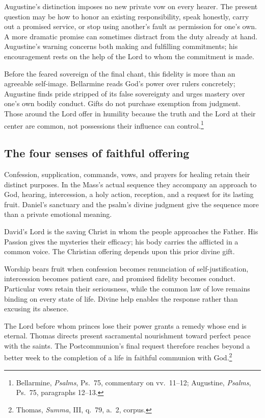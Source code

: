 Augustine's distinction imposes no new private vow on every hearer. The present question may be how to honor an existing responsibility, speak honestly, carry out a promised service, or stop using another's fault as permission for one's own. A more dramatic promise can sometimes distract from the duty already at hand. Augustine's warning concerns both making and fulfilling commitments; his encouragement rests on the help of the Lord to whom the commitment is made.

Before the feared sovereign of the final chant, this fidelity is more than an agreeable self-image. Bellarmine reads God's power over rulers concretely; Augustine finds pride stripped of its false sovereignty and urges mastery over one's own bodily conduct. Gifts do not purchase exemption from judgment. Those around the Lord offer in humility because the truth and the Lord at their center are common, not possessions their influence can control.\footnote{Bellarmine, \textit{Psalms}, Ps.~75, commentary on vv.~11--12; Augustine, \textit{Psalms}, Ps.~75, paragraphs 12--13.}

\subsection{The four senses of faithful offering}
\begin{fourSenses}
\item[Literal.] Confession, supplication, commands, vows, and prayers for healing retain their distinct purposes. In the Mass's actual sequence they accompany an approach to God, hearing, intercession, a holy action, reception, and a request for its lasting fruit. Daniel's sanctuary and the psalm's divine judgment give the sequence more than a private emotional meaning.

\item[Allegorical.] David's Lord is the saving Christ in whom the people approaches the Father. His Passion gives the mysteries their efficacy; his body carries the afflicted in a common voice. The Christian offering depends upon this prior divine gift.

\item[Moral.] Worship bears fruit when confession becomes renunciation of self-justification, intercession becomes patient care, and promised fidelity becomes conduct. Particular vows retain their seriousness, while the common law of love remains binding on every state of life. Divine help enables the response rather than excusing its absence.

\item[Anagogical.] The Lord before whom princes lose their power grants a remedy whose end is eternal. Thomas directs present sacramental nourishment toward perfect peace with the saints. The Postcommunion's final request therefore reaches beyond a better week to the completion of a life in faithful communion with God.\footnote{Thomas, \textit{Summa}, III, q.~79, a.~2, corpus.}
\end{fourSenses}
